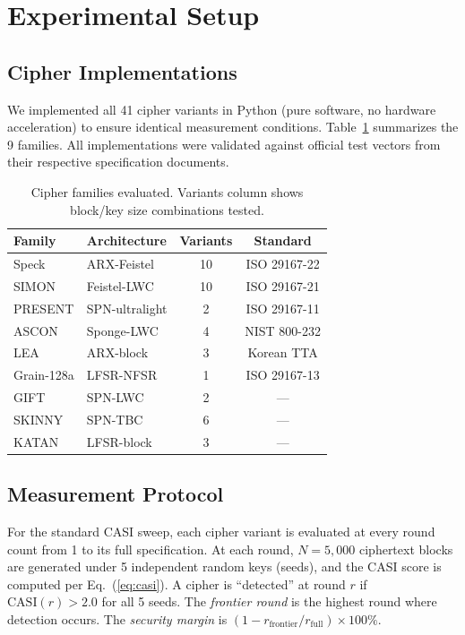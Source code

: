 \documentclass[conference]{IEEEtran}
\begin{document}
\section{Experimental Setup}
\label{sec:setup}

\subsection{Cipher Implementations}

We implemented all 41 cipher variants in Python (pure software, no hardware acceleration) to ensure identical measurement conditions.
Table~\ref{tab:families} summarizes the 9 families.
All implementations were validated against official test vectors from their respective specification documents.

\begin{table}[t]
\centering
\caption{Cipher families evaluated. Variants column shows block/key size combinations tested.}
\label{tab:families}
\small
\begin{tabular}{@{}llcc@{}}
\toprule
\textbf{Family} & \textbf{Architecture} & \textbf{Variants} & \textbf{Standard} \\
\midrule
Speck    & ARX-Feistel   & 10 & ISO 29167-22 \\
SIMON    & Feistel-LWC   & 10 & ISO 29167-21 \\
PRESENT  & SPN-ultralight & 2 & ISO 29167-11 \\
ASCON    & Sponge-LWC     & 4 & NIST 800-232 \\
LEA      & ARX-block      & 3 & Korean TTA \\
Grain-128a & LFSR-NFSR    & 1 & ISO 29167-13 \\
GIFT     & SPN-LWC        & 2 & --- \\
SKINNY   & SPN-TBC        & 6 & --- \\
KATAN    & LFSR-block     & 3 & --- \\
\bottomrule
\end{tabular}
\end{table}

\subsection{Measurement Protocol}

For the standard CASI sweep, each cipher variant is evaluated at every round count from 1 to its full specification.
At each round, $N = 5{,}000$ ciphertext blocks are generated under 5 independent random keys (seeds), and the CASI score is computed per Eq.~(\ref{eq:casi}).
A cipher is ``detected'' at round $r$ if $\text{CASI}(r) > 2.0$ for all 5 seeds.
The \emph{frontier round} is the highest round where detection occurs.
The \emph{security margin} is $(1 - r_{\text{frontier}} / r_{\text{full}}) \times 100\%$.
\end{document}
